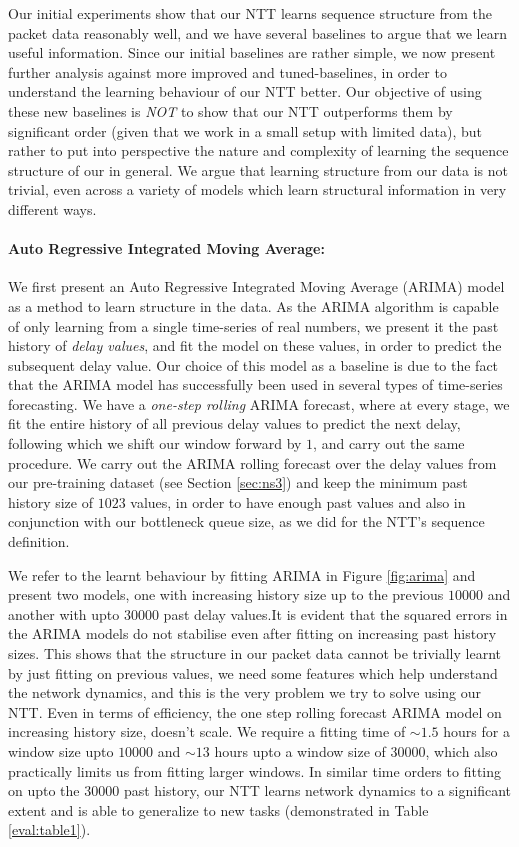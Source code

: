 Our initial experiments show that our NTT learns sequence structure from the packet data reasonably well, and we have several baselines to argue that we learn useful information. Since our initial baselines are rather simple, we now present further analysis against more improved and tuned-baselines, in order to understand the learning behaviour of our NTT better. Our objective of using these new baselines is \emph{NOT} to show that our NTT outperforms them by significant order (given that we work in a small setup with limited data), but rather to put into perspective the nature and complexity of learning the sequence structure of our in general. We argue that learning structure from our data is not trivial, even across a variety of models which learn structural information in very different ways.

\paragraph*{Auto Regressive Integrated Moving Average:}

We first present an Auto Regressive Integrated Moving Average (ARIMA)\cite{arima} model as a method to learn structure in the data. As the ARIMA algorithm is capable of only learning from a single time-series of real numbers, we present it the past history of \emph{delay values}, and fit the model on these values, in order to predict the subsequent delay value. Our choice of this model as a baseline is due to the fact that the ARIMA  model has successfully been used in several types of time-series forecasting\cite{arimasuc}. We have a \emph{one-step rolling} ARIMA forecast, where at every stage, we fit the entire history of all previous delay values to predict the next delay, following which we shift our window forward by $1$, and carry out the same procedure. We carry out the ARIMA rolling forecast over the delay values from our pre-training dataset (see Section \ref{sec:ns3}) and keep the minimum past history size of $1023$ values, in order to have enough past values and also in conjunction with our bottleneck queue size, as we did for the NTT's sequence definition.

We refer to the learnt behaviour by fitting ARIMA in Figure \ref{fig:arima} and present two models, one with increasing history size up to the previous $10000$ and another with upto $30000$ past delay values.It is evident that the squared errors in the ARIMA models do not stabilise even after fitting on increasing past history sizes. This shows that the structure in our packet data cannot be trivially learnt by just fitting on previous values, we need some features which help understand the network dynamics, and this is the very problem we try to solve using our NTT. Even in terms of efficiency, the one step rolling forecast ARIMA model on increasing history size, doesn't scale. We require a fitting time of $\sim1.5$ hours for a window size upto $10000$ and $\sim13$ hours upto a window size of $30000$, which also practically limits us from fitting larger windows. In similar time orders to fitting on upto the $30000$ past history, our NTT learns network dynamics to a significant extent and is able to generalize to new tasks (demonstrated in Table \ref{eval:table1}).

